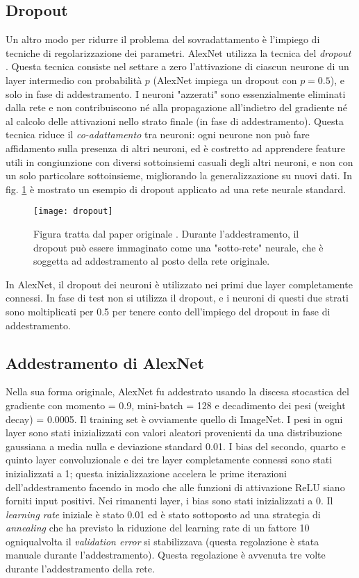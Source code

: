 \subsection{Dropout}
\label{dropout}
Un altro modo per ridurre il problema del sovradattamento è l'impiego di tecniche di regolarizzazione dei parametri. AlexNet utilizza la tecnica del \textit{dropout} \cite{dropout}. Questa tecnica consiste nel settare a zero l'attivazione di ciascun neurone di un layer intermedio con probabilità $p$ (AlexNet impiega un dropout con $p=0.5$), e solo in fase di addestramento. I neuroni "azzerati" sono essenzialmente eliminati dalla rete e non contribuiscono né alla propagazione all'indietro del gradiente né al calcolo delle attivazioni nello strato finale (in fase di addestramento). Questa tecnica riduce il \textit{co-adattamento} tra neuroni: ogni neurone non può fare affidamento sulla presenza di altri neuroni, ed è costretto ad apprendere feature utili in congiunzione con diversi sottoinsiemi casuali degli altri neuroni, e non con un solo particolare sottoinsieme, migliorando la generalizzazione su nuovi dati. In fig. \ref{fig:dropout} è mostrato un esempio di dropout applicato ad una rete neurale standard.

\begin{figure}[h!]
\centering
\texttt{[image: dropout]}
\caption{Figura tratta dal paper originale \cite{dropout}. Durante l'addestramento, il dropout può essere immaginato come una "sotto-rete" neurale, che è soggetta ad addestramento al posto della rete originale.}
\label{fig:dropout}
\end{figure}

In AlexNet, il dropout dei neuroni è utilizzato nei primi due layer completamente connessi. In fase di test non si utilizza il dropout, e i neuroni di questi due strati sono moltiplicati per 0.5 per tenere conto dell'impiego del dropout in fase di addestramento.

\subsection{Addestramento di AlexNet}
Nella sua forma originale, AlexNet fu addestrato usando la discesa stocastica del gradiente con momento = 0.9, mini-batch = 128 e decadimento dei pesi (weight decay) = 0.0005. Il training set è ovviamente quello di ImageNet.
I pesi in ogni layer sono stati inizializzati con valori aleatori provenienti da una distribuzione gaussiana a media nulla e deviazione standard 0.01. I bias del secondo, quarto e quinto layer convoluzionale e dei tre layer completamente connessi sono stati inizializzati a 1; questa inizializzazione accelera le prime iterazioni dell'addestramento facendo in modo che alle funzioni di attivazione ReLU siano forniti input positivi. Nei rimanenti layer, i bias sono stati inizializzati a 0. Il \textit{learning rate} iniziale è stato 0.01 ed è stato sottoposto ad una strategia di \textit{annealing} che ha previsto la riduzione del learning rate di un fattore 10 ogniqualvolta il \textit{validation error} si stabilizzava (questa regolazione è stata manuale durante l'addestramento). Questa regolazione è avvenuta tre volte durante l'addestramento della rete.

